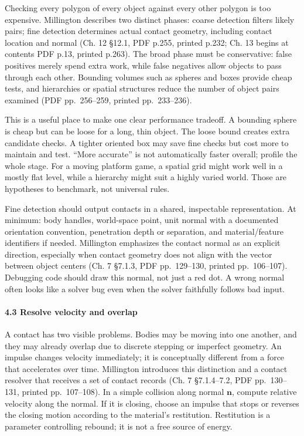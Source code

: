 \hypertarget{06-engine-ii-ch033-find-candidate-pairs-before-detailed-contact}{}

Checking every polygon of every object against every other polygon is too expensive. Millington describes two distinct phases: coarse detection filters likely pairs; fine detection determines actual contact geometry, including contact location and normal (Ch. 12 §12.1, PDF p.255, printed p.232; Ch. 13 begins at contents PDF p.13, printed p.263). The broad phase must be conservative: false positives merely spend extra work, while false negatives allow objects to pass through each other. Bounding volumes such as spheres and boxes provide cheap tests, and hierarchies or spatial structures reduce the number of object pairs examined (PDF pp.~256--259, printed pp.~233--236).

This is a useful place to make one clear performance tradeoff. A bounding sphere is cheap but can be loose for a long, thin object. The loose bound creates extra candidate checks. A tighter oriented box may save fine checks but cost more to maintain and test. ``More accurate'' is not automatically faster overall; profile the whole stage. For a moving platform game, a spatial grid might work well in a mostly flat level, while a hierarchy might suit a highly varied world. Those are hypotheses to benchmark, not universal rules.

Fine detection should output contacts in a shared, inspectable representation. At minimum: body handles, world-space point, unit normal with a documented orientation convention, penetration depth or separation, and material/feature identifiers if needed. Millington emphasizes the contact normal as an explicit direction, especially when contact geometry does not align with the vector between object centers (Ch. 7 §7.1.3, PDF pp.~129--130, printed pp.~106--107). Debugging code should draw this normal, not just a red dot. A wrong normal often looks like a solver bug even when the solver faithfully follows bad input.

\paragraph{4.3 Resolve velocity and overlap}\label{06-engine-ii-ch033-resolve-velocity-and-overlap}

\hypertarget{06-engine-ii-ch033-resolve-velocity-and-overlap}{}

A contact has two visible problems. Bodies may be moving into one another, and they may already overlap due to discrete stepping or imperfect geometry. An impulse changes velocity immediately; it is conceptually different from a force that accelerates over time. Millington introduces this distinction and a contact resolver that receives a set of contact records (Ch. 7 §7.1.4--7.2, PDF pp.~130--131, printed pp.~107--108). In a simple collision along normal \(\mathbf{n}\), compute relative velocity along the normal. If it is closing, choose an impulse that stops or reverses the closing motion according to the material's restitution. Restitution is a parameter controlling rebound; it is not a free source of energy.

